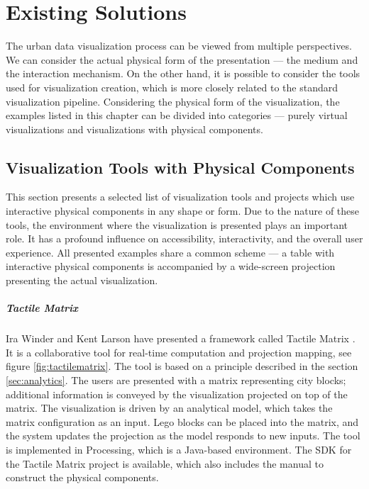 \chapter{Existing Solutions}
\label{chapter:solutions}
The urban data visualization process can be viewed from multiple perspectives. We can consider the actual physical form of the presentation --- the medium and the interaction mechanism. On the other hand, it is possible to consider the tools used for visualization creation, which is more closely related to the standard visualization pipeline. Considering the physical form of the visualization, the examples listed in this chapter can be divided into categories --- purely virtual visualizations and visualizations with physical components.

\section{Visualization Tools with Physical Components}
This section presents a selected list of visualization tools and projects which use interactive physical components in any shape or form. Due to the nature of these tools, the environment where the visualization is presented plays an important role. It has a profound influence on accessibility, interactivity, and the overall user experience. All presented examples share a common scheme --- a table with interactive physical components is accompanied by a wide-screen projection presenting the actual visualization.   

\paragraph{Tactile Matrix}
Ira Winder and Kent Larson have presented a framework called Tactile Matrix \cite{winderTangible2017}. It is a collaborative tool for real-time computation and projection mapping, see figure \ref{fig:tactilematrix}. The tool is based on a principle described in the section \ref{sec:analytics}. The users are presented with a matrix representing city blocks; additional information is conveyed by the visualization projected on top of the matrix. The visualization is driven by an analytical model, which takes the matrix configuration as an input. Lego blocks can be placed into the matrix, and the system updates the projection as the model responds to new inputs. The tool is implemented in Processing, which is a Java-based environment. The SDK for the Tactile Matrix project is available, which also includes the manual to construct the physical components.

